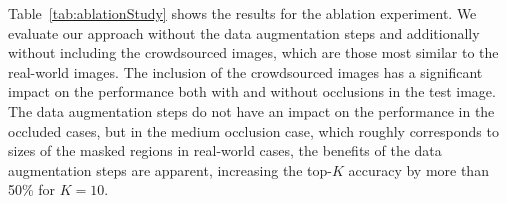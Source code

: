 Table~\ref{tab:ablationStudy} shows the results for the ablation experiment. We evaluate our approach
without the data augmentation steps and additionally without including the crowdsourced images, which are those most similar to the real-world images. The inclusion of the crowdsourced images has a significant impact on the performance both with and without occlusions in the test image. The data augmentation steps do not have an impact on the performance in the occluded cases, but in the medium occlusion case, which roughly corresponds to sizes of the masked regions in real-world cases, the benefits of the data augmentation steps are apparent, increasing the top-$K$ accuracy by more than 50\% for $K=10$.